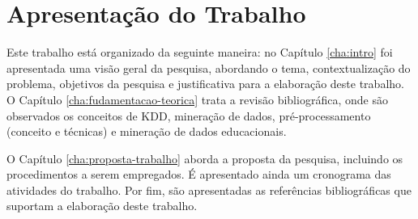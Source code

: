 \section{Apresentação do Trabalho}
\label{sec:apresentacao-trabalho}

Este trabalho está organizado da seguinte maneira: no Capítulo \ref{cha:intro} foi apresentada uma visão geral da pesquisa, abordando o tema, contextualização do problema, objetivos da pesquisa e justificativa para a elaboração deste trabalho. O Capítulo \ref{cha:fudamentacao-teorica} trata a revisão bibliográfica, onde são observados os conceitos de KDD, mineração de dados, pré\hyp{}processamento (conceito e técnicas) e mineração de dados educacionais.

O Capítulo \ref{cha:proposta-trabalho} aborda a proposta da pesquisa, incluindo os procedimentos a serem empregados. É apresentado ainda um cronograma das atividades do trabalho. Por fim, são apresentadas as referências bibliográficas que suportam a elaboração deste trabalho.

